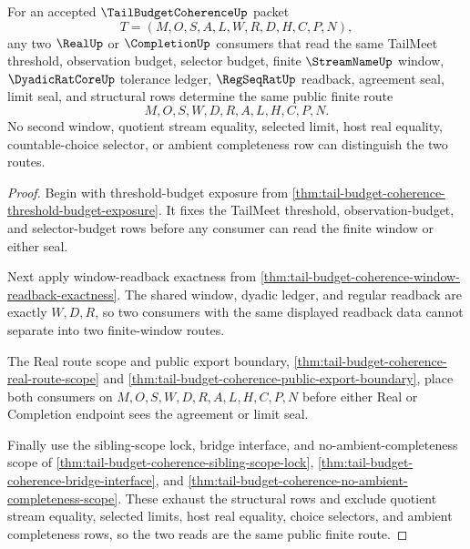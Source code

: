 \begin{theorem}
\label{thm:tail-budget-coherence-finite-route-determinacy}
For an accepted $\TailBudgetCoherenceUp$ packet
$$
T=(M,O,S,A,L,W,R,D,H,C,P,N),
$$
any two $\RealUp$ or $\CompletionUp$ consumers that read the same TailMeet threshold, observation budget, selector budget, finite $\StreamNameUp$ window, $\DyadicRatCoreUp$ tolerance ledger, $\RegSeqRatUp$ readback, agreement seal, limit seal, and structural rows determine the same public finite route
$$
M,O,S,W,D,R,A,L,H,C,P,N.
$$
No second window, quotient stream equality, selected limit, host real equality, countable-choice selector, or ambient completeness row can distinguish the two routes.
\end{theorem}
\begin{proof}
Begin with threshold-budget exposure from \autoref{thm:tail-budget-coherence-threshold-budget-exposure}. It fixes the TailMeet threshold, observation-budget, and selector-budget rows before any consumer can read the finite window or either seal.

Next apply window-readback exactness from \autoref{thm:tail-budget-coherence-window-readback-exactness}. The shared window, dyadic ledger, and regular readback are exactly $W,D,R$, so two consumers with the same displayed readback data cannot separate into two finite-window routes.

The Real route scope and public export boundary, \autoref{thm:tail-budget-coherence-real-route-scope} and \autoref{thm:tail-budget-coherence-public-export-boundary}, place both consumers on $M,O,S,W,D,R,A,L,H,C,P,N$ before either Real or Completion endpoint sees the agreement or limit seal.

Finally use the sibling-scope lock, bridge interface, and no-ambient-completeness scope of \autoref{thm:tail-budget-coherence-sibling-scope-lock}, \autoref{thm:tail-budget-coherence-bridge-interface}, and \autoref{thm:tail-budget-coherence-no-ambient-completeness-scope}. These exhaust the structural rows and exclude quotient stream equality, selected limits, host real equality, choice selectors, and ambient completeness rows, so the two reads are the same public finite route.
\end{proof}

